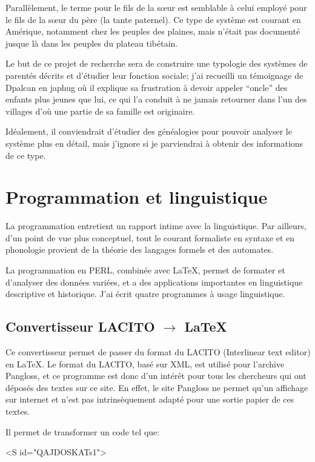 \documentclass[oldfontcommands,oneside,a4paper,11pt]{memoir}
\begin{document}
Parallèlement, le terme pour le fils de la sœur est semblable à celui employé pour le fils de la sœur du père (la tante paternel).  Ce type de système est courant en Amérique, notamment chez les peuples des plaines, mais n'était pas documenté jusque là dans les peuples du plateau tibétain.


Le but de ce projet de recherche sera de construire une typologie des systèmes de parentés décrits et d'étudier leur fonction sociale; j'ai recueilli un témoignage de Dpalcan en japhug où il explique sa frustration à devoir appeler ``oncle'' des enfants plus jeunes que lui, ce qui l'a conduit à ne jamais retourner dans l'un des villages d'où une partie de sa famille est originaire.

Idéalement, il conviendrait d'étudier des généalogies pour pouvoir analyser le système plus en détail, mais j'ignore si je parviendrai à obtenir des informations de ce type.
 
\chapter{Programmation et linguistique}
La programmation entretient un rapport intime avec la linguistique.  Par ailleurs, d'un point de vue plus conceptuel, tout le courant formaliste en syntaxe et en phonologie provient de la théorie des langages formels et des automates. 



La programmation en PERL, combinée avec \LaTeX, permet de formater et d'analyser des données variées, et a des applications importantes en linguistique descriptive et   historique. J'ai écrit quatre programmes à usage linguistique.


\section{Convertisseur LACITO $\rightarrow $ \LaTeX}
Ce convertisseur permet de passer du format du LACITO (Interlinear text editor) en \LaTeX{}. Le format du LACITO, basé sur XML, est utilisé pour l'archive Pangloss, et ce programme est donc d'un intérêt pour tous les chercheurs qui ont déposés des textes sur ce site. En effet, le site Pangloss ne permet qu'un affichage sur internet et n'est pas intrinsèquement adapté pour une sortie papier de ces textes. 

Il permet de transformer un code tel que:



 <S id="QAJDOSKATs1">
 
\end{document}
